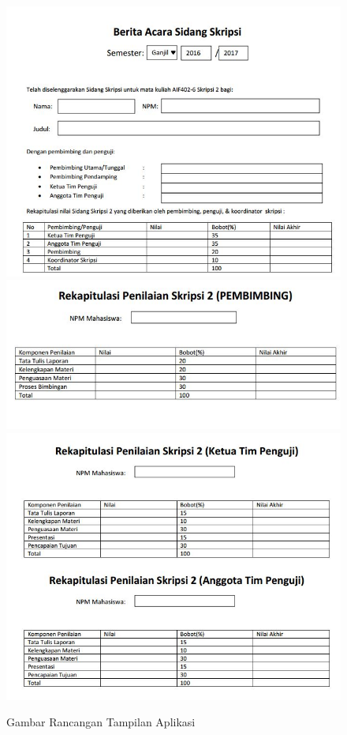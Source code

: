 \documentclass[a4paper,twoside]{article}
\begin{document}
\begin{enumerate}
			\begin{figure}[H]
				\centering
				\includegraphics[scale=0.5]{Gambar/tampilan1}
				\includegraphics[scale=0.5]{Gambar/tampilan2}
				\includegraphics[scale=0.5]{Gambar/tampilan3}
				\caption{Gambar Rancangan Tampilan Aplikasi}
				\label{fig:tampilan}
			\end{figure}
		

\end{enumerate}
\end{document}
